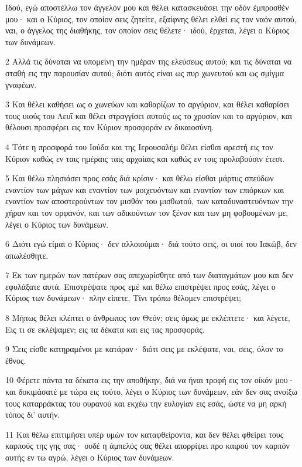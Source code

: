 \par Ιδού, εγώ αποστέλλω τον άγγελόν μου και θέλει κατασκευάσει την οδόν έμπροσθέν μου· και ο Κύριος, τον οποίον σεις ζητείτε, εξαίφνης θέλει ελθεί εις τον ναόν αυτού, ναι, ο άγγελος της διαθήκης, τον οποίον σεις θέλετε· ιδού, έρχεται, λέγει ο Κύριος των δυνάμεων.
\par 2 Αλλά τις δύναται να υπομείνη την ημέραν της ελεύσεως αυτού; και τις δύναται να σταθή εις την παρουσίαν αυτού; διότι αυτός είναι ως πυρ χωνευτού και ως σμίγμα γναφέων.
\par 3 Και θέλει καθήσει ως ο χωνεύων και καθαρίζων το αργύριον, και θέλει καθαρίσει τους υιούς του Λευΐ και θέλει στραγγίσει αυτούς ως το χρυσίον και το αργύριον, και θέλουσι προσφέρει εις τον Κύριον προσφοράν εν δικαιοσύνη.
\par 4 Τότε η προσφορά του Ιούδα και της Ιερουσαλήμ θέλει είσθαι αρεστή εις τον Κύριον καθώς εν ταις ημέραις ταις αρχαίαις και καθώς εν τοις προλαβούσιν έτεσι.
\par 5 Και θέλω πλησιάσει προς εσάς διά κρίσιν· και θέλω είσθαι μάρτυς σπεύδων εναντίον των μάγων και εναντίον των μοιχευόντων και εναντίον των επιόρκων και εναντίον των αποστερούντων τον μισθόν του μισθωτού, των καταδυναστευόντων την χήραν και τον ορφανόν, και των αδικούντων τον ξένον και των μη φοβουμένων με, λέγει ο Κύριος των δυνάμεων.
\par 6 Διότι εγώ είμαι ο Κύριος· δεν αλλοιούμαι· διά τούτο σεις, οι υιοί του Ιακώβ, δεν απωλέσθητε.
\par 7 Εκ των ημερών των πατέρων σας απεχωρίσθητε από των διαταγμάτων μου και δεν εφυλάξατε αυτά. Επιστρέψατε προς εμέ και θέλω επιστρέψει προς εσάς, λέγει ο Κύριος των δυνάμεων· πλην είπετε, Τίνι τρόπω θέλομεν επιστρέψει;
\par 8 Μήπως θέλει κλέπτει ο άνθρωπος τον Θεόν; σεις όμως με εκλέπτετε· και λέγετε, Εις τι σε εκλέψαμεν; εις τα δέκατα και εις τας προσφοράς.
\par 9 Σεις είσθε κατηραμένοι με κατάραν· διότι σεις με εκλέψατε, ναι, σεις, όλον το έθνος.
\par 10 Φέρετε πάντα τα δέκατα εις την αποθήκην, διά να ήναι τροφή εις τον οίκόν μου· και δοκιμάσατέ με τώρα εις τούτο, λέγει ο Κύριος των δυνάμεων, εάν δεν σας ανοίξω τους καταρράκτας του ουρανού και εκχέω την ευλογίαν εις εσάς, ώστε να μη αρκή τόπος δι' αυτήν.
\par 11 Και θέλω επιτιμήσει υπέρ υμών τον καταφθείροντα, και δεν θέλει φθείρει τους καρπούς της γης σας· ουδέ η άμπελός σας θέλει απορρίψει προ καιρού τον καρπόν αυτής εν τω αγρώ, λέγει ο Κύριος των δυνάμεων.
